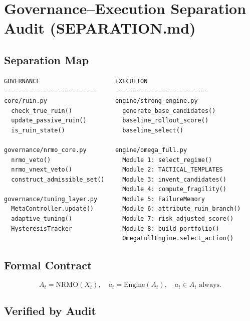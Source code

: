 \section{Governance--Execution Separation Audit
(SEPARATION.md)}
\label{sec:impl-separation-audit}


\subsection{Separation Map}

\begin{lstlisting}[basicstyle=\ttfamily\scriptsize,frame=single]
GOVERNANCE                     EXECUTION
--------------------------     --------------------------
core/ruin.py                   engine/strong_engine.py
  check_true_ruin()              generate_base_candidates()
  update_passive_ruin()          baseline_rollout_score()
  is_ruin_state()                baseline_select()

governance/nrmo_core.py        engine/omega_full.py
  nrmo_veto()                    Module 1: select_regime()
  nrmo_vnext_veto()              Module 2: TACTICAL_TEMPLATES
  construct_admissible_set()     Module 3: invent_candidates()
                                 Module 4: compute_fragility()
governance/tuning_layer.py       Module 5: FailureMemory
  MetaController.update()        Module 6: attribute_ruin_branch()
  adaptive_tuning()              Module 7: risk_adjusted_score()
  HysteresisTracker              Module 8: build_portfolio()
                                 OmegaFullEngine.select_action()
\end{lstlisting}

\subsection{Formal Contract}

\begin{equation}
A_t = \mathrm{NRMO}(X_t),
\quad
a_t = \mathrm{Engine}(A_t),
\quad
a_t \in A_t \text{ always}.
\end{equation}

\subsection{Verified by Audit}

